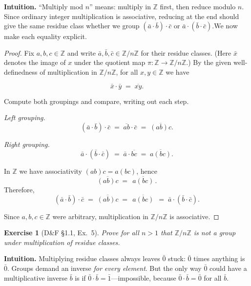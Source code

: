 \documentclass[12pt]{article}
\newtheorem{exercise}[theorem]{Exercise}
\theoremstyle{definition}
\begin{document}
\dotfill

\noindent
\textbf{Intuition.}
“Multiply mod $n$” means: multiply in $\mathbb{Z}$ first, then reduce modulo $n$. Since ordinary integer multiplication is associative, reducing at the end should give the same residue class whether we group $(\bar a\cdot\bar b)\cdot\bar c$ or $\bar a\cdot(\bar b\cdot\bar c)$.We now make each equality explicit.

\dotfill

\begin{proof}
Fix $a,b,c\in\mathbb{Z}$ and write $\bar a,\bar b,\bar c\in\mathbb{Z}/n\mathbb{Z}$ for their residue classes. (Here $\bar x$ denotes the image of $x$ under the quotient map $\pi:\mathbb{Z}\to\mathbb{Z}/n\mathbb{Z}$.) By the given well-definedness of multiplication in $\mathbb{Z}/n\mathbb{Z}$, for all $x,y\in\mathbb{Z}$ we have

\[
\bar x\cdot\bar y \;=\; \overline{xy}.
\]

Compute both groupings and compare, writing out each step.

\dotfill

\noindent\emph{Left grouping.}
\[
(\bar a\cdot\bar b)\cdot\bar c
\;=\; \overline{ab}\cdot\bar c
\;=\; \overline{(ab)c}.
\]

\noindent\emph{Right grouping.}
\[
\bar a\cdot(\bar b\cdot\bar c)
\;=\; \bar a\cdot\overline{bc}
\;=\; \overline{a(bc)}.
\]

In $\mathbb{Z}$ we have associativity $(ab)c=a(bc)$, hence
\[
\overline{(ab)c} \;=\; \overline{\,a(bc)\,}.
\]
Therefore,
\[
(\bar a\cdot\bar b)\cdot\bar c
\;=\; \overline{(ab)c}
\;=\; \overline{\,a(bc)\,}
\;=\; \bar a\cdot(\bar b\cdot\bar c).
\]

Since $a,b,c\in\mathbb{Z}$ were arbitrary, multiplication in $\mathbb{Z}/n\mathbb{Z}$ is associative.
\end{proof}

\newpage

\begin{exercise}[D\&F §1.1, Ex.~5]
Prove for all $n>1$ that $\mathbb{Z}/n\mathbb{Z}$ is not a group under multiplication of residue classes.
\end{exercise}

\dotfill

\noindent
\textbf{Intuition.}
Multiplying residue classes always leaves $\bar 0$ stuck: $\bar 0$ times anything is $\bar 0$. Groups demand an inverse \emph{for every element}. But the only way $\bar 0$ could have a multiplicative inverse $\bar b$ is if $\bar 0\cdot \bar b=\bar 1$—impossible, because $\bar 0\cdot \bar b=\bar 0$ for all $\bar b$.
\end{document}

